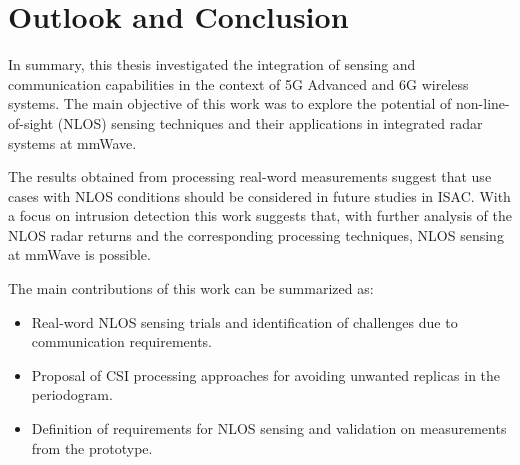 \chapter{Outlook and Conclusion}

In summary, this thesis investigated the integration of sensing and communication capabilities in the context of 5G Advanced and 6G wireless systems. 
The main objective of this work was to explore the potential of non-line-of-sight (NLOS) sensing techniques and their applications in integrated radar systems at mmWave. 

The results obtained from processing real-word measurements suggest that use cases with NLOS conditions should be considered in future studies in ISAC.
With a focus on intrusion detection this work suggests that, with further analysis of the NLOS radar returns and the corresponding processing techniques, NLOS sensing at mmWave is possible.

The main contributions of this work can be summarized as:

\begin{itemize}
	\item Real-word NLOS sensing trials and identification of challenges due to communication requirements.
	\item Proposal of CSI processing approaches for avoiding unwanted replicas in the periodogram.
	\item Definition of requirements for NLOS sensing and validation on measurements from the prototype.
\end{itemize}

